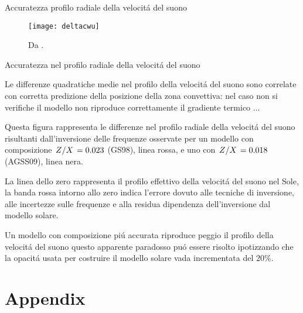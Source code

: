 \documentclass[10pt,xcolor={usenames},fleqn,mathserif,serif]{beamer}
\begin{document}
\begin{frame}{Accuratezza profilo radiale della velocit\'a del suono}

\begin{figure}[!ht]%
        \texttt{[image: deltacwu]}
        \caption{Da \cite{villante2014chemical}.}\label{fig:deltacwu}
\end{figure}

\end{frame}

\begin{wordonframe}{Accuratezza nel profilo radiale della velocit\'a del suono}

Le differenze quadratiche medie nel profilo della velocit\'a del suono sono  correlate con corretta predizione della posizione della zona convettiva: nel caso non si verifiche il modello non riproduce correttamente il gradiente termico ...

Questa figura rappresenta le differenze nel profilo radiale della velocit\'a del suono risultanti dall'inversione delle frequenze osservate per un modello con composizione $\left.{Z}\middle/{X}\right.=0.023$ (GS98), linea rossa, e uno con $\left.{Z}\middle/{X}\right.=0.018$ (AGSS09), linea nera.

La linea dello zero rappresenta il profilo effettivo della velocit\'a del suono nel Sole, la banda rossa intorno allo zero indica l'errore dovuto alle tecniche di inversione, alle incertezze sulle frequenze e alla residua dipendenza dell'inversione dal modello solare.

Un modello con composizione pi\'u accurata riproduce peggio il profilo della velocit\'a del suono questo apparente paradosso pu\'o essere risolto ipotizzando che la opacit\'a usata per costruire il modello solare vada incrementata del $20\%$.

\end{wordonframe}

\section{Appendix}
\end{document}
